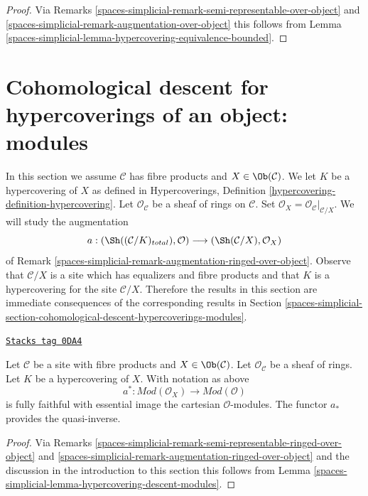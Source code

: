 \begin{proof}
Via Remarks \ref{spaces-simplicial-remark-semi-representable-over-object} and
\ref{spaces-simplicial-remark-augmentation-over-object}
this follows from Lemma \ref{spaces-simplicial-lemma-hypercovering-equivalence-bounded}.
\end{proof}

\section{Cohomological descent for hypercoverings of an object: modules}
\label{spaces-simplicial-section-cohomological-descent-hypercoverings-X-modules}
In this section we assume $\mathcal{C}$ has fibre products
and $X \in \Ob(\mathcal{C})$. We let $K$ be a hypercovering of $X$
as defined in
Hypercoverings, Definition \ref{hypercovering-definition-hypercovering}.
Let $\mathcal{O}_\mathcal{C}$ be a sheaf of rings on $\mathcal{C}$.
Set $\mathcal{O}_X = \mathcal{O}_\mathcal{C}|_{\mathcal{C}/X}$.
We will study the augmentation
$$
a :
(\Sh((\mathcal{C}/K)_{total}), \mathcal{O})
\longrightarrow
(\Sh(\mathcal{C}/X), \mathcal{O}_X)
$$
of Remark \ref{spaces-simplicial-remark-augmentation-ringed-over-object}.
Observe that $\mathcal{C}/X$ is a site which has equalizers
and fibre products and that $K$ is a
hypercovering for the site $\mathcal{C}/X$.
Therefore the results in this section are immediate consequences
of the corresponding results in
Section \ref{spaces-simplicial-section-cohomological-descent-hypercoverings-modules}.

\begin{lemma}
\label{spaces-simplicial-lemma-hypercovering-X-descent-modules}
\href{https://stacks.math.columbia.edu/tag/0DA4}{\texttt{Stacks tag 0DA4}}

Let $\mathcal{C}$ be a site with fibre products and $X \in \Ob(\mathcal{C})$.
Let $\mathcal{O}_\mathcal{C}$ be a sheaf of rings.
Let $K$ be a hypercovering of $X$. With notation as above
$$
a^* : \textit{Mod}(\mathcal{O}_X) \to \textit{Mod}(\mathcal{O})
$$
is fully faithful with essential image the cartesian $\mathcal{O}$-modules.
The functor $a_*$ provides the quasi-inverse.
\end{lemma}

\begin{proof}
Via Remarks \ref{spaces-simplicial-remark-semi-representable-ringed-over-object} and
\ref{spaces-simplicial-remark-augmentation-ringed-over-object} and the discussion in
the introduction to this section
this follows from Lemma \ref{spaces-simplicial-lemma-hypercovering-descent-modules}.
\end{proof}


